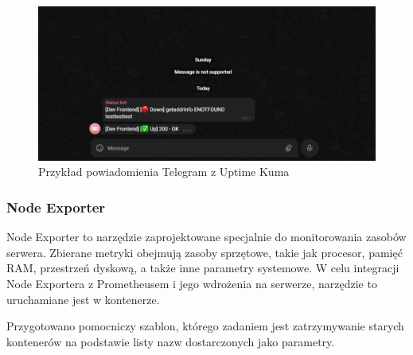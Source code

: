\documentclass{article}
\begin{document}
\begin{figure}[H]
    \centering
    \includegraphics[width=1\linewidth]{uptimeKumaTelegram.png}
    \caption{Przykład powiadomienia Telegram z Uptime Kuma}
    \label{fig:telegram-alert}
\end{figure}

\subsubsection{Node Exporter}

Node Exporter to narzędzie zaprojektowane specjalnie do monitorowania zasobów serwera. Zbierane metryki obejmują zasoby sprzętowe, takie jak procesor, pamięć RAM, przestrzeń dyskową, a także inne parametry systemowe. W celu integracji Node Exportera z Prometheusem i jego wdrożenia na serwerze, narzędzie to uruchamiane jest w kontenerze.

Przygotowano pomocniczy szablon, którego zadaniem jest zatrzymywanie starych kontenerów na podstawie listy nazw dostarczonych jako parametry.
\end{document}
